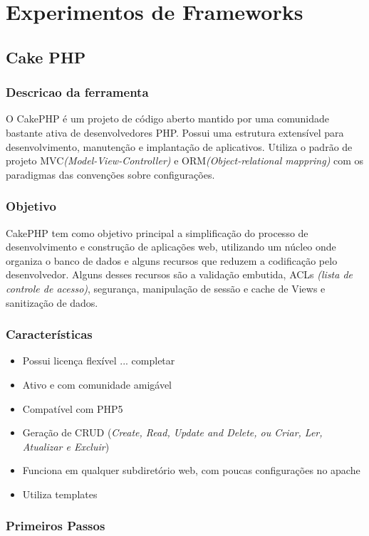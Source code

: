 \chapter{Experimentos de Frameworks\label{cap:experimento}}

    \section{Cake PHP\label{sec:cake-php}}
        \subsection{Descricao da ferramenta\label{sub:descricao-cake}}

            O CakePHP é um projeto de código aberto mantido por uma comunidade bastante ativa de desenvolvedores PHP. Possui uma estrutura extensível para desenvolvimento, manutenção e implantação de aplicativos. Utiliza o padrão de projeto MVC\emph{(Model-View-Controller)} e ORM\emph{(Object-relational mappring)} com os paradigmas das convenções sobre configurações.


        \subsection{Objetivo\label{sub:objetivo-cake}}

            CakePHP tem como objetivo principal a simplificação do processo de desenvolvimento e construção de aplicações web, utilizando um núcleo onde organiza o banco de dados e alguns recursos que reduzem a codificação pelo desenvolvedor. Alguns desses recursos são a validação embutida, ACLs \emph{(lista de controle de acesso)}, segurança, manipulação de sessão e cache de Views e sanitização de dados.


        \subsection{Características\label{sub:caracteristicas-cake}}
            \begin{itemize}
                \item Possui licença flexível ... completar
                \item Ativo e com comunidade amigável
                \item Compatível com PHP5
                \item Geração de CRUD (\emph{Create, Read, Update and Delete, ou Criar, Ler, Atualizar e Excluir})
                \item Funciona em qualquer subdiretório web, com poucas configurações no apache
                \item Utiliza templates
            \end{itemize}


        \subsection{Primeiros Passos\label{sub:primeiros-passos-cake}}
